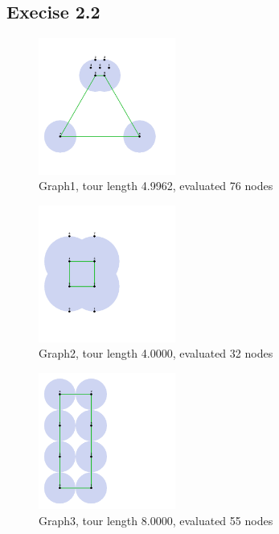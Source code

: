 \documentclass[11pt,a4paper]{article}
\begin{document}
\subsection{Execise 2.2}
\begin{figure}[h!]
    \centering
    \includegraphics[width=0.4\textwidth, trim=0px 0px 200px 0px]{graph1.png}
    \caption{Graph1, tour length 4.9962, evaluated 76 nodes}
\end{figure}
\begin{figure}[h!]
    \centering
    \includegraphics[width=0.4\textwidth, trim=0px 0px 200px 0px]{graph2.png}
    \caption{Graph2, tour length 4.0000, evaluated 32 nodes}
\end{figure}
\begin{figure}[h!]
    \centering
    \includegraphics[width=0.4\textwidth, trim=0px 0px 300px 0px]{graph3.png}
    \caption{Graph3, tour length 8.0000, evaluated 55 nodes}
\end{figure}




\end{document}
